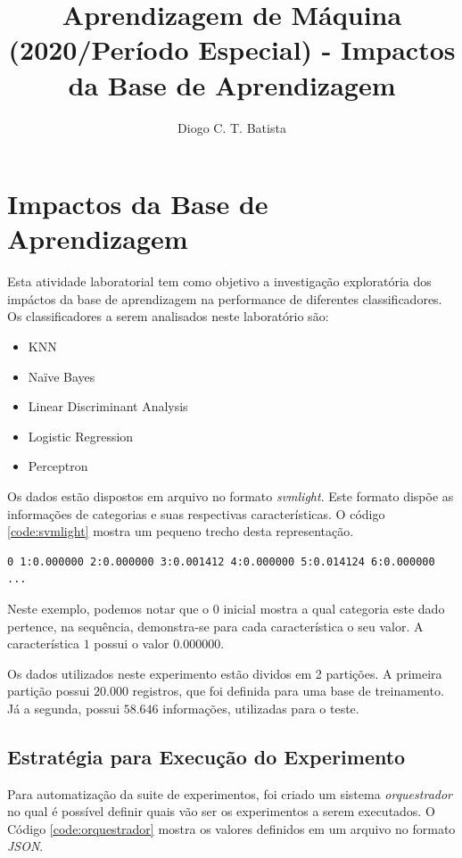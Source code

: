 \documentclass[12pt]{article}
\title{Aprendizagem de Máquina (2020/Período Especial) - Impactos da Base de Aprendizagem}
\author{Diogo C. T. Batista\inst{1}}
\begin{document}
\maketitle

\section{Impactos da Base de Aprendizagem}

Esta atividade laboratorial tem como objetivo a investigação exploratória dos impáctos da base de aprendizagem na performance de diferentes classificadores. Os classificadores a serem analisados neste laboratório são:

\begin{itemize}
  \item KNN
  \item Naïve Bayes
  \item Linear Discriminant Analysis
  \item Logistic Regression
  \item Perceptron
\end{itemize}

Os dados estão dispostos em arquivo no formato \textit{svmlight}. Este formato dispõe as informações de categorias e suas respectivas características. O código \ref{code:svmlight} mostra um pequeno trecho desta representação.

\begin{lstlisting}[caption={Exemplo do Formato de Entrada},captionpos=b,frame=single,label={code:svmlight}]
0 1:0.000000 2:0.000000 3:0.001412 4:0.000000 5:0.014124 6:0.000000 ...
\end{lstlisting}

Neste exemplo, podemos notar que o $0$ inicial mostra a qual categoria este dado pertence, na sequência, demonstra-se para cada característica o seu valor. A característica $1$ possui o valor $0.000000$.

Os dados utilizados neste experimento estão dividos em 2 partições. A primeira partição possui $20.000$ registros, que foi definida para uma base de treinamento. Já a segunda, possui $58.646$ informações, utilizadas para o teste.

\subsection{Estratégia para Execução do Experimento}

Para automatização da suite de experimentos, foi criado um sistema \textit{orquestrador} no qual é possível definir quais vão ser os experimentos a serem executados. O Código \ref{code:orquestrador} mostra os valores definidos em um arquivo no formato \textit{JSON}.
\end{document}
